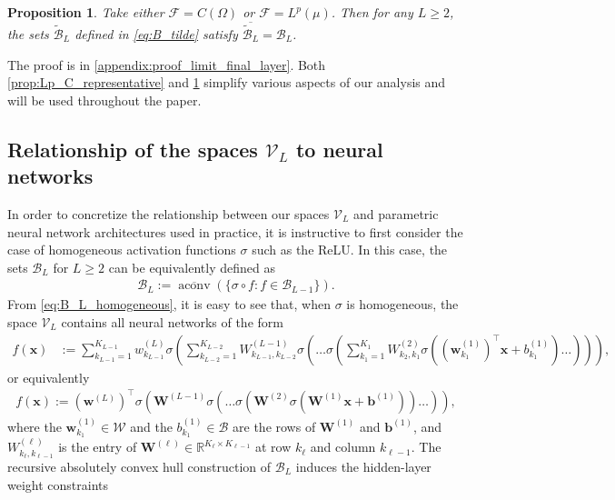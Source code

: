 \documentclass{article}
\DeclareMathOperator{\aconv}{\mathrm{aconv}}
\def\vb{{\bm{b}}}
\def\vw{{\bm{w}}}
\def\vx{{\bm{x}}}
\def\mW{{\bm{W}}}
\def\cB{{\mathcal{B}}}
\def\cF{{\mathcal{F}}}
\def\cV{{\mathcal{V}}}
\def\cW{{\mathcal{W}}}
\newcommand{\R}{\mathbb{R}}
\newtheorem{proposition}[theorem]{Proposition}
\begin{document}
\begin{proposition} \label{prop:limit_final_layer}
    Take either $\cF = C(\Omega)$ or $\cF = L^p(\mu)$. Then for any $L \geq 2$, the sets $\widetilde{\cB}_L$ defined in \eqref{eq:B_tilde} satisfy $\overline{\widetilde{\cB}_L} = \cB_L$.
\end{proposition}
The proof is in \cref{appendix:proof_limit_final_layer}. Both \cref{prop:Lp_C_representative} and \cref{prop:limit_final_layer} simplify various aspects of our analysis and will be used throughout the paper.

\subsection{Relationship of the spaces $\cV_L$ to neural networks} \label{sec:relationship_neural_networks}
In order to concretize the relationship between our spaces $\cV_L$ and parametric neural network architectures used in practice, it is instructive to first consider the case of homogeneous activation functions $\sigma$ such as the ReLU. In this case, the sets $\cB_L$ for $L \geq 2$ can be equivalently defined as
\begin{align} \label{eq:B_L_homogeneous}
    \cB_L := \overline{\aconv} \left( \{ \sigma \circ f: f \in \cB_{L-1} \} \right).
\end{align}
From \eqref{eq:B_L_homogeneous}, it is easy to see that, when $\sigma$ is homogeneous, the space $\cV_L$ contains all neural networks of the form
\begin{align} \label{eq:deep_nn_sum}
    f(\vx) &:= \sum_{k_{L-1}=1}^{K_{L-1}} w_{k_{L-1}}^{(L)} \sigma \left( \sum_{k_{L-2}=1}^{K_{L-2}} W_{k_{L-1},k_{L-2}}^{(L-1)} \sigma \left(  \dots \sigma \left( \sum_{k_1=1}^{K_1} W_{k_2, k_1}^{(2)} \sigma \left( ( \vw_{k_1}^{(1)} )^\top \vx + b_{k_1}^{(1)}  \right) \dots  \right)\right) \right),
\end{align}
or equivalently
\begin{align}  \label{eq:deep_nn_matrix}
        f(\vx) := (\vw^{(L)})^\top \sigma \left( \mW^{(L-1)} \sigma \left( \dots \sigma \left( \mW^{(2)} \sigma \left( \mW^{(1)} \vx + \vb^{(1)} \right) \right) \dots \right) \right),
    \end{align}
where the $\vw_{k_1}^{(1)} \in \cW$ and the $b_{k_1}^{(1)} \in \cB$ are the rows of $\mW^{(1)}$ and $\vb^{(1)}$, and $W_{k_\ell, k_{\ell-1}}^{(\ell)}$ is the entry of $\mW^{(\ell)} \in \R^{K_\ell \times K_{\ell-1}}$ at row $k_\ell$ and column $k_{\ell-1}$. The recursive absolutely convex hull construction of $\cB_L$ induces the hidden-layer weight constraints
\end{document}
